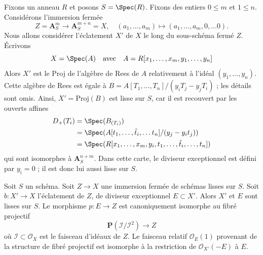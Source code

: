 \begin{remark}
\label{remark-relative-blowup}
Fixons un anneau $R$ et posons $S = \Spec(R)$. Fixons des entiers $0 \leq m$ et
$1 \leq n$. Considérons l'immersion fermée
$$
Z = \mathbf{A}^m_S \longrightarrow \mathbf{A}^{m + n}_S = X,\quad
(a_1, \ldots, a_m) \mapsto (a_1, \ldots, a_m, 0, \ldots 0).
$$
Nous allons considérer l'éclatement $X'$ de $X$
le long du sous-schéma fermé $Z$. Écrivons
$$
X = \Spec(A)
\quad\text{avec}\quad
A = R[x_1, \ldots, x_m, y_1, \ldots, y_n]
$$
Alors $X'$ est le Proj de l'algèbre de Rees de $A$ relativement à
l'idéal $(y_1, \ldots, y_n)$. Cette algèbre de Rees est égale à
$B = A[T_1, \ldots, T_n]/(y_iT_j - y_jT_i)$ ; les détails sont omis.
Ainsi, $X' = \text{Proj}(B)$ est lisse sur $S$, car il est
recouvert par les ouverts affines
\begin{align*}
D_+(T_i)
& =
\Spec(B_{(T_i)}) \\
& =
\Spec(A[t_1, \ldots, \hat t_i, \ldots t_n]/(y_j - y_i t_j)) \\
& =
\Spec(R[x_1, \ldots, x_m, y_i, t_1, \ldots, \hat t_i, \ldots, t_n])
\end{align*}
qui sont isomorphes à $\mathbf{A}^{n + m}_S$.
Dans cette carte, le diviseur exceptionnel est défini par
$y_i = 0$ ; il est donc lui aussi lisse
sur $S$.
\end{remark}

\begin{lemma}
\label{lemma-blowup}
Soit $S$ un schéma. Soit $Z \to X$ une immersion fermée de schémas
lisses sur $S$. Soit $b : X' \to X$ l'éclatement de $Z$,
de diviseur exceptionnel $E \subset X'$. Alors $X'$ et $E$ sont lisses
sur $S$. Le morphisme $p : E \to Z$ est canoniquement isomorphe
au fibré projectif
$$
\mathbf{P}(\mathcal{I}/\mathcal{I}^2) \longrightarrow Z
$$
où $\mathcal{I} \subset \mathcal{O}_X$ est le faisceau d'idéaux
de $Z$. Le faisceau relatif $\mathcal{O}_E(1)$ provenant de la structure
de fibré projectif est isomorphe à la restriction de
$\mathcal{O}_{X'}(-E)$ à $E$.
\end{lemma}

